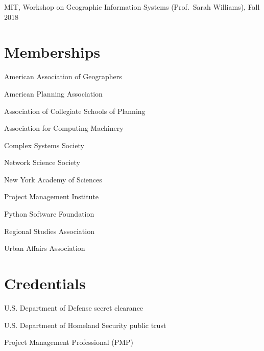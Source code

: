 \documentclass[12pt,letterpaper]{report}
\newcommand{\listitemspace}{0.25em}
\renewenvironment{itemize}
{\begin{list}{}{\setlength{\leftmargin}{0em}
                \setlength{\parskip}{0em}
                \setlength{\itemsep}{\listitemspace}
                \setlength{\parsep}{\listitemspace}}}
{\end{list}}
\begin{document}
    \begin{itemize}

        \item MIT, Workshop on Geographic Information Systems (Prof.\ Sarah Williams), Fall 2018

    \end{itemize}



    \section*{Memberships}

    \begin{itemize}

        \item American Association of Geographers
        \item American Planning Association
        \item Association of Collegiate Schools of Planning
        \item Association for Computing Machinery
        \item Complex Systems Society
        \item Network Science Society
        \item New York Academy of Sciences
        \item Project Management Institute
        \item Python Software Foundation
        \item Regional Studies Association
        \item Urban Affairs Association

    \end{itemize}



    \section*{Credentials}

    \begin{itemize}

        \item U.S. Department of Defense secret clearance
        \item U.S. Department of Homeland Security public trust
        \item Project Management Professional (PMP)

    \end{itemize}
\end{document}
